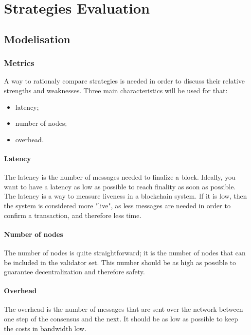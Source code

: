 \chapter{Strategies Evaluation}
\label{chap:strategies}

\section{Modelisation}
\subsection{Metrics}
A way to rationaly compare strategies is needed in order to discuss their
relative strengths and weaknesses. Three main characteristics will be used for
that:
\begin{itemize}
        \item latency;
        \item number of nodes;
        \item overhead.
\end{itemize}

\subsubsection{Latency}
The latency is the number of messages needed to finalize a block. Ideally, you
want to have a latency as low as possible to reach finality as soon as possible.
The latency is a way to measure liveness in a blockchain system. If it is low,
then the system is considered more "live", as less messages are needed in order
to confirm a transaction, and therefore less time.

\subsubsection{Number of nodes}
The number of nodes is quite straightforward; it is the number of nodes that can
be included in the validator set. This number should be as high as possible to
guarantee decentralization and therefore safety.

\subsubsection{Overhead}
The overhead is the number of messages that are sent over the network between
one step of the consensus and the next. It should be as low as possible to keep
the costs in bandwidth low.


